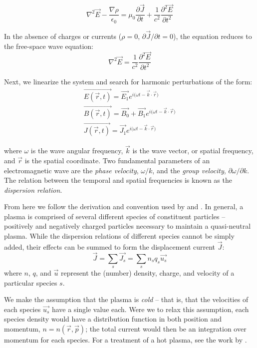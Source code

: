 \begin{equation}
\nabla^2\vec{E} - \frac{\nabla\rho}{\epsilon_0} = \mu_0 \frac{\partial \vec{J}}{\partial t} + \frac{1}{c^2}\frac{\partial^2\vec{E}}{\partial t^2}
\label{eqn:dielectric_tensor_derivation_1}
\end{equation}

In the absence of charges or currents ($\rho=0$, $\partial\vec{J}/\partial t=0$), the equation reduces to the free-space wave equation:
\begin{equation}
\nabla^2\vec{E} = \frac{1}{c^2}\frac{\partial^2\vec{E}}{\partial t^2}
\end{equation}

Next, we linearize the system and search for harmonic perturbations of the form:
\begin{eqnarray}
\vec{E(\vec{r},t)} = \vec{E_1}e^{{i (\omega t - \vec{k}\cdot \vec{r}})} \label{eqn:linear1}\\ 
\vec{B(\vec{r},t)} = \vec{B_0} + \vec{B_1}e^{{i (\omega t - \vec{k}\cdot \vec{r}})} \label{eqn:linear2}\\
\vec{J(\vec{r},t)} = \vec{J_1}e^{{i (\omega t - \vec{k}\cdot \vec{r}})}\label{eqn:linear3} 
\end{eqnarray}

where $\omega$ is the wave angular frequency, $\vec{k}$ is the wave vector, or spatial frequency, and $\vec{r}$ is the spatial coordinate. Two fundamental parameters of an electromagnetic wave are the \emph{phase velocity}, $\omega/k$, and the \emph{group velocity}, $\partial\omega/\partial k$. The relation between the temporal and spatial frequencies is known as the \emph{dispersion relation}.

From here we follow the derivation and convention used by \cite{Stix1992} and \cite{Bittencourt2004}. In general, a plasma is comprised of several different species of constituent particles -- positively and negatively charged particles necessary to maintain a quasi-neutral plasma. While the dispersion relations of different species cannot be simply added, their effects can be summed to form the displacement current $\vec{J}$:
\begin{equation}
\vec{J} = \sum_s\vec{J_s} = \sum_s n_s q_s \vec{u_s}
\label{eqn:J}
\end{equation}
where $n$, $q$, and $\vec{u}$ represent the (number) density, charge, and velocity of a particular species $s$. 

We make the assumption that the plasma is \emph{cold} -- that is, that the velocities of each species $\vec{u_s}$ have a single value each. Were we to relax this assumption, each species density would have a distribution function in both position and momentum, $n=n(\vec{r},\vec{p})$; the total current would then be an integration over momentum for each species. For a treatment of a hot plasma, see the work by \cite{Sazhin1993}.


